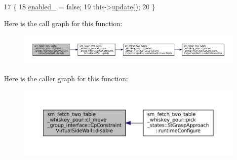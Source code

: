 \begin{DoxyCode}
17         \{
18             \hyperlink{classsm__fetch__two__table__whiskey__pour_1_1cl__move__group__interface_1_1CpConstraintVirtualSideWall_afdb21410cf37966fbdf12366ebc6dd02}{enabled\_} = \textcolor{keyword}{false};
19             this->\hyperlink{classsm__fetch__two__table__whiskey__pour_1_1cl__move__group__interface_1_1CpConstraintVirtualSideWall_a0d810890cc65189012a33af233d18c9f}{update}();
20         \}
\end{DoxyCode}
Here is the call graph for this function\+:
\nopagebreak
\begin{figure}[H]
\begin{center}
\leavevmode
\includegraphics[width=350pt]{classsm__fetch__two__table__whiskey__pour_1_1cl__move__group__interface_1_1CpConstraintVirtualSideWall_aaffa435c29c04bb3e6554d6f5931eca9_cgraph}
\end{center}
\end{figure}
Here is the caller graph for this function\+:
\nopagebreak
\begin{figure}[H]
\begin{center}
\leavevmode
\includegraphics[width=350pt]{classsm__fetch__two__table__whiskey__pour_1_1cl__move__group__interface_1_1CpConstraintVirtualSideWall_aaffa435c29c04bb3e6554d6f5931eca9_icgraph}
\end{center}
\end{figure}
\mbox{\label{classsm__fetch__two__table__whiskey__pour_1_1cl__move__group__interface_1_1CpConstraintVirtualSideWall_a3664ab7add203ea576aa6f575b50b4a3}} 
